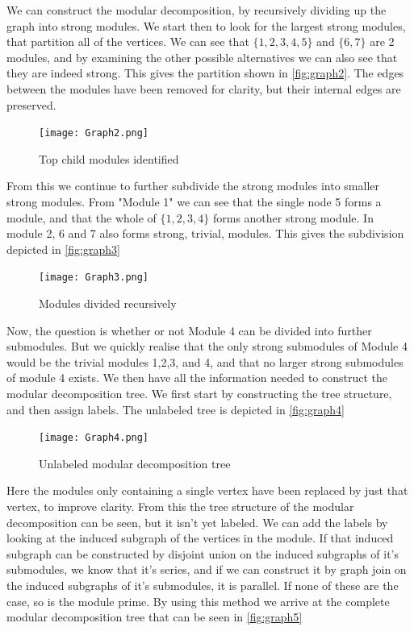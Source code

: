 \documentclass[a4paper]{article}
\begin{document}
We can construct the modular decomposition, by recursively dividing up the graph
into strong modules. We start then to look for the largest strong modules, that
partition all of the vertices. We can see that $\{1,2,3,4,5\}$ and $\{6,7\}$
are 2 modules, and by examining the other possible alternatives we can also
see that they are indeed strong. This gives the partition shown in 
\autoref{fig:graph2}. The edges between the modules have been removed for
clarity, but their internal edges are preserved.

\begin{figure}[H]
    \texttt{[image: Graph2.png]}
    \caption{Top child modules identified}
    \label{fig:graph2}
\end{figure}

From this we continue to further subdivide the strong modules into smaller
strong modules. From "Module 1" we can see that the single node 5 forms a
module, and that the whole of $\{1,2,3,4\}$ forms another strong module.
In module 2, 6 and 7 also forms strong, trivial, modules. This gives the
subdivision depicted in \autoref{fig:graph3}

\begin{figure}[H]
    \texttt{[image: Graph3.png]}
    \caption{Modules divided recursively}
    \label{fig:graph3}
\end{figure}

Now, the question is whether or not Module 4 can be divided into further
submodules. But we quickly realise that the only strong submodules of Module 4
would be the trivial modules 1,2,3, and 4, and that no larger strong submodules
of module 4 exists. We then have all the information needed to construct the
modular decomposition tree. We first start by constructing the tree structure,
and then assign labels. The unlabeled tree is depicted in \autoref{fig:graph4}

\begin{figure}[H]
    \texttt{[image: Graph4.png]}
    \caption{Unlabeled modular decomposition tree}
    \label{fig:graph4}
\end{figure}

Here the modules only containing a single vertex have been replaced by just that
vertex, to improve clarity. From this the tree structure of the modular
decomposition can be seen, but it isn't yet labeled. We can add the labels by 
looking at the induced subgraph of the vertices in the module. If that induced
subgraph can be constructed by disjoint union on the induced subgraphs of it's
submodules, we know that it's series, and if we can construct it by graph join on
the induced subgraphs of it's submodules, it is parallel. If none of these are
the case, so is the module prime. By using this method we arrive at the complete
modular decomposition tree that can be seen in \autoref{fig:graph5}
\end{document}
